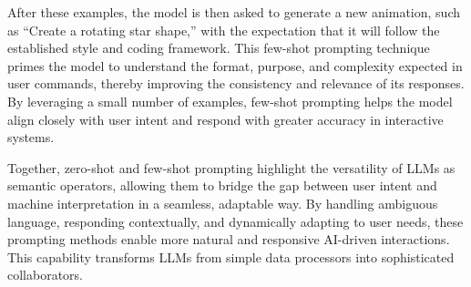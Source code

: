 After these examples, the model is then asked to generate a new animation, such as “Create a rotating star shape,” with the expectation that it will follow the established style and coding framework.
This few-shot prompting technique primes the model to understand the format, purpose, and complexity expected in user commands, thereby improving the consistency and relevance of its responses.
By leveraging a small number of examples, few-shot prompting helps the model align closely with user intent and respond with greater accuracy in interactive systems.

Together, zero-shot and few-shot prompting highlight the versatility of LLMs as semantic operators, allowing them to bridge the gap between user intent and machine interpretation in a seamless, adaptable way.
By handling ambiguous language, responding contextually, and dynamically adapting to user needs, these prompting methods enable more natural and responsive AI-driven interactions.
This capability transforms LLMs from simple data processors into sophisticated collaborators.





